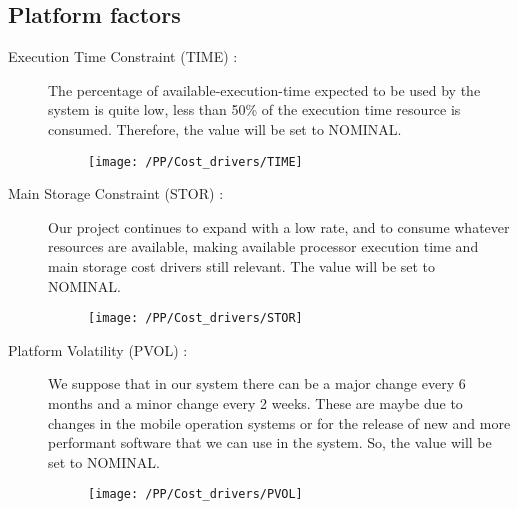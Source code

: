 \subsection{Platform factors}
\begin{description}
    \item [Execution Time Constraint (TIME) :] The percentage of available-execution-time expected to be used by the system is quite low, less than 50\% of the execution time resource is consumed. Therefore, the value will be set to NOMINAL.
    \begin{figure}[!ht]
      \centering
      \vspace{0.2cm}
      \texttt{[image: /PP/Cost\_drivers/TIME]}\\
      \vspace{0.2cm}
      \label{fig:TIME} 
    \end{figure}
    \item [Main Storage Constraint (STOR) :] Our project continues to expand with a low rate, and to consume whatever resources are available, making available processor execution time and main storage cost drivers still relevant. The value will be set to NOMINAL.
    \begin{figure}[!ht]
      \centering
      \vspace{0.2cm}
      \texttt{[image: /PP/Cost\_drivers/STOR]}\\
      \vspace{0.2cm}
      \label{fig:STOR} 
    \end{figure}
    \item [Platform Volatility (PVOL) :] We suppose that in our system there can be a major change every 6 months and a minor change every 2 weeks. These are maybe due to changes in the mobile operation systems or for the release of new and more performant software that we can use in the system. So, the value will be set to NOMINAL. 
    \begin{figure}[!ht]
      \centering
      \vspace{0.2cm}
      \texttt{[image: /PP/Cost\_drivers/PVOL]}\\
      \vspace{0.2cm}
      \label{fig:PVOL} 
    \end{figure}
\end{description}

